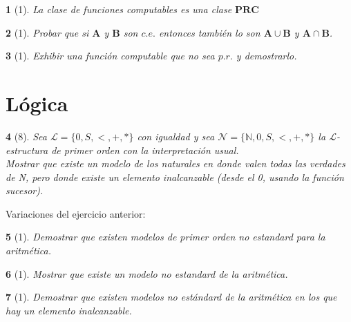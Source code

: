 \documentclass[leqno, 12pt, twoside,letterpaper]{book}
\theoremstyle{plain}
\newtheorem{ej}{}
\theoremstyle{definition}
\newcommand{\ba}[0]{\bm{A}}
\begin{document}
\begin{ej}[1]
    La clase de funciones computables es una clase $\bm{PRC}$
\end{ej}

\begin{ej}[1]
    Probar que si $\ba$ y $\bm{B}$ son $c.e.$ entonces también lo son $\ba \cup
    \bm{B}$ y $\ba \cap \bm{B}$.
\end{ej}


\begin{ej}[1]
    Exhibir una función computable que no sea $p.r.$ y demostrarlo.
\end{ej}


\section*{Lógica}

\begin{ej}[8]
    Sea $\bm{\mathcal{L}} = \{0, S, <, +, *\}$ con igualdad y sea
    $\bm{\mathcal{N}} = \{\mathbb{N},
    0, S, <, +, *\}$ la $\bm{\mathcal{L}}$-estructura de primer orden con la
    interpretación usual. \\ Mostrar que existe un modelo de los naturales en donde
    valen todas las verdades de N, pero donde existe un elemento inalcanzable
    (desde el 0, usando la función sucesor).
\end{ej}

\noindent Variaciones del ejercicio anterior:

\begin{ej}[1]
    Demostrar que existen modelos de primer orden no estandard para la
    aritmética.
\end{ej}

\begin{ej}[1]
    Mostrar que existe un modelo no estandard de la aritmética.
\end{ej}

\begin{ej}[1]
    Demostrar que existen modelos no estándard de la aritmética en los que hay
    un elemento inalcanzable.
\end{ej}
\end{document}
